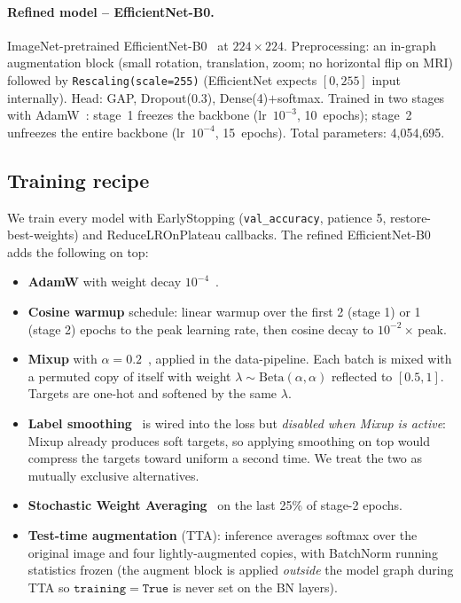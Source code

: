 \documentclass[journal,onecolumn,11pt]{IEEEtran}
\begin{document}
\paragraph{Refined model -- EfficientNet-B0.}
ImageNet-pretrained EfficientNet-B0~\cite{tan2019efficientnet} at
$224{\times}224$. Preprocessing: an in-graph augmentation block
(small rotation, translation, zoom; no horizontal flip on MRI) followed by
\verb|Rescaling(scale=255)| (EfficientNet expects $[0, 255]$ input
internally). Head: GAP, Dropout(0.3), Dense(4)$+$softmax. Trained in two
stages with AdamW~\cite{loshchilov2019adamw}: stage~1 freezes the backbone
(lr~$10^{-3}$, 10~epochs); stage~2 unfreezes the entire backbone
(lr~$10^{-4}$, 15~epochs). Total parameters: 4{,}054{,}695.

\subsection{Training recipe}
We train every model with EarlyStopping (\verb|val_accuracy|, patience 5,
restore-best-weights) and ReduceLROnPlateau callbacks. The refined
EfficientNet-B0 adds the following on top:

\begin{itemize}[leftmargin=*,itemsep=1pt,topsep=1pt]
  \item \textbf{AdamW} with weight decay $10^{-4}$~\cite{loshchilov2019adamw}.
  \item \textbf{Cosine warmup} schedule: linear warmup over the first 2 (stage 1) or 1 (stage 2)
        epochs to the peak learning rate, then cosine decay to $10^{-2}\!\times$\,peak.
  \item \textbf{Mixup} with $\alpha = 0.2$~\cite{zhang2018mixup}, applied in the
        data-pipeline. Each batch is mixed with a permuted copy of itself with
        weight $\lambda \sim \mathrm{Beta}(\alpha, \alpha)$ reflected to $[0.5, 1]$.
        Targets are one-hot and softened by the same $\lambda$.
  \item \textbf{Label smoothing}~\cite{szegedy2016inceptionv3} is wired into the
        loss but \emph{disabled when Mixup is active}: Mixup already produces
        soft targets, so applying smoothing on top would compress the targets
        toward uniform a second time. We treat the two as mutually exclusive
        alternatives.
  \item \textbf{Stochastic Weight Averaging}~\cite{izmailov2018swa} on the last
        25\% of stage-2 epochs.
  \item \textbf{Test-time augmentation} (TTA): inference averages softmax over
        the original image and four lightly-augmented copies, with BatchNorm
        running statistics frozen (the augment block is applied \emph{outside}
        the model graph during TTA so $\mathtt{training=True}$ is never set on
        the BN layers).
\end{itemize}
\end{document}
